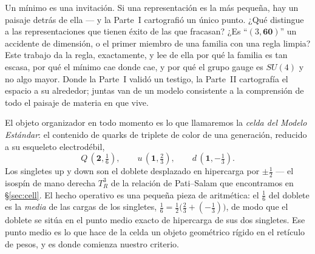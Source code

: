 \documentclass[11pt,a4paper]{article}
\begin{document}
Un mínimo es una invitación. Si una representación es la más pequeña, hay un paisaje detrás de
ella --- y la Parte~I cartografió un único punto. ¿Qué distingue a las representaciones que
tienen éxito de las que fracasan? ¿Es ``$(3,\mathbf{60})$'' un accidente de dimensión, o el
primer miembro de una familia con una regla limpia? Este trabajo da la regla, exactamente, y
lee de ella por qué la familia es tan escasa, por qué el mínimo cae donde cae, y por qué el
grupo gauge es $SU(4)$ y no algo mayor. Donde la Parte~I validó un testigo, la Parte~II
cartografía el espacio a su alrededor; juntas van de un modelo consistente a la comprensión de
todo el paisaje de materia en que vive.

El objeto organizador en todo momento es lo que llamaremos la \emph{celda del Modelo
Estándar}: el contenido de quarks de triplete de color de una generación, reducido a su
esqueleto electrodébil,
\[
Q\,(\mathbf{2},\tfrac16),\qquad u\,(\mathbf{1},\tfrac23),\qquad d\,(\mathbf{1},-\tfrac13).
\]
Los singletes up y down son el doblete desplazado en hipercarga por $\pm\tfrac12$ --- el
isospín de mano derecha $T^3_R$ de la relación de Pati--Salam que encontramos en
\S\ref{sec:cell}. El hecho operativo es una pequeña pieza de aritmética: el $\tfrac16$ del
doblete es la \emph{media} de las cargas de los singletes,
$\tfrac16=\tfrac12\!\big(\tfrac23+(-\tfrac13)\big)$, de modo que el doblete se sitúa en el
punto medio exacto de hipercarga de sus dos singletes. Ese punto medio es lo que hace de la
celda un objeto geométrico rígido en el retículo de pesos, y es donde comienza nuestro
criterio.
\end{document}
